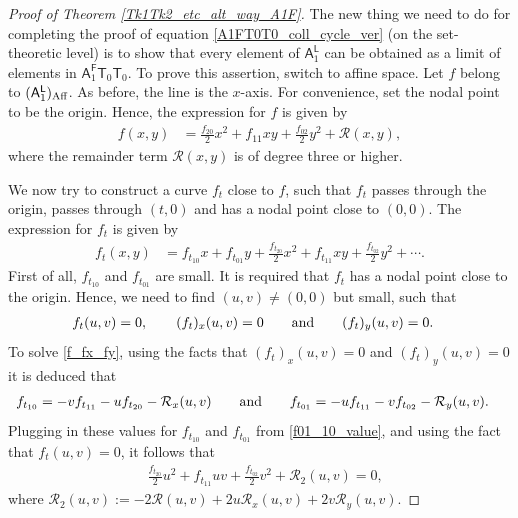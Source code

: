 \documentclass[pdftex]{sigma}
\numberwithin{equation}{section}
\begin{document}
\begin{proof}[Proof of Theorem \ref{Tk1Tk2_etc_alt_way_A1F}]
The new thing we need to do for completing the proof of
equation \eqref{A1FT0T0_coll_cycle_ver}
(on the set-theoretic level) is to show that every element of
$\mathsf{A}_1^{\mathsf{L}}$ can be obtained as a limit of elements
in $\mathsf{A}_1^{\mathsf{F}} \mathsf{T}_{0}\mathsf{T}_0$. To prove this assertion, switch to affine space.
Let $f$ belong to
$(\mathsf{A}_1^{\mathsf{L}})_{\textnormal{Aff}}$. As before, the line is the $x$-axis. For convenience, set the
nodal point to be the origin. Hence, the expression for $f$ is given by
\begin{align*}
f(x, y)& = \frac{f_{20}}{2} x^2 + f_{11} xy + \frac{f_{02}}{2}y^2 + \mathcal{R}(x, y),
\end{align*}
where the remainder term $\mathcal{R}(x, y)$ is of degree three or higher.

We now try to construct a curve $f_t$ close to $f$, such that $f_t$ passes through the origin, passes through
$(t, 0)$ and has a nodal point close to $(0, 0)$. The expression for $f_t$ is given by
\begin{align*}
f_{t}(x, y) & = f_{t_{10}} x + f_{t_{01}} y + \frac{f_{t_{20}}}{2} x^2 + f_{t_{11}} xy + \frac{f_{t_{02}}}{2}y^2 + \cdots.
\end{align*}
First of all, $f_{t_{10}}$ and $f_{t_{01}}$ are small.
It is required that $f_t$ has a nodal point close to the origin.
Hence, we need to find $(u, v) \neq (0, 0)$ but small, such that
\begin{align}
f_t(u, v) & = 0, \qquad
(f_{t})_x(u,v) = 0 \qquad \textnormal{and} \qquad (f_{t})_y(u, v) = 0. \label{f_fx_fy}
\end{align}
To solve \eqref{f_fx_fy}, using the facts that
$(f_{t})_x(u,v) = 0$
and
$(f_{t})_y(u,v) = 0$
it is deduced that
\begin{align}
f_{t_{10}} & = -vf_{t_{11}}-uf_{t_{20}}-\mathcal{R}_x(u, v) \qquad \textnormal{and} \qquad f_{t_{01}} = -uf_{t_{11}}-vf_{t_{02}}
-\mathcal{R}_y(u, v). \label{f01_10_value}
\end{align}
Plugging in these values for $f_{t_{10}}$ and $f_{t_{01}}$ from \eqref{f01_10_value}, and
using the fact that $f_t(u, v) = 0$, it follows that
\begin{align}
& \frac{f_{t_{20}}}{2} u^2 + f_{t_{11}} uv + \frac{f_{t_{02}}}{2} v^2 + \mathcal{R}_2(u,v)  =  0, \label{xy_zero}
\end{align}
where $\mathcal{R}_2(u, v) := -2\mathcal{R}(u, v)+2u \mathcal{R}_x(u, v) + 2v \mathcal{R}_y(u, v)$.


\end{proof}
\end{document}
